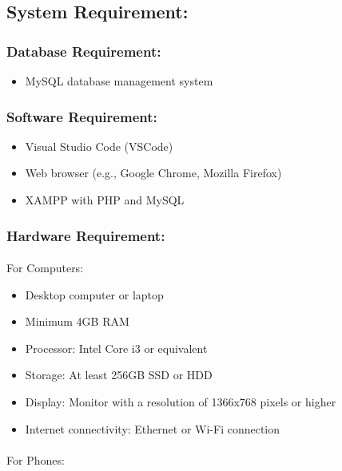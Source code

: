 \newpage


\subsection{System Requirement:}
\subsubsection{Database Requirement:}
\begin{itemize}
    

\item MySQL database management system
\end{itemize}

\subsubsection{Software Requirement:}
\begin{itemize}

\item Visual Studio Code (VSCode)
\item Web browser (e.g., Google Chrome, Mozilla Firefox)
\item XAMPP with PHP and MySQL

\end{itemize}

\subsubsection{Hardware Requirement:}
\paragraph{} For Computers:

\begin{itemize}
\item Desktop computer or laptop
\item Minimum 4GB RAM
\item Processor: Intel Core i3 or equivalent
\item Storage: At least 256GB SSD or HDD
\item Display: Monitor with a resolution of 1366x768 pixels or higher
\item Internet connectivity: Ethernet or Wi-Fi connection
\end{itemize}

\paragraph{} For Phones:

